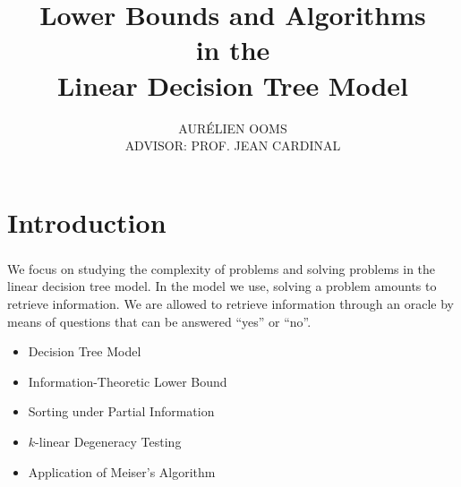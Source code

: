 \documentclass[10pt,xcolor=x11names,dvipsnames,hyperref={colorlinks=false,breaklinks=true,bookmarks=true}]{beamer}
\begin{document}
\title[]{\textbf{Lower Bounds and Algorithms\\ in the\\ Linear Decision Tree Model\vspace{3mm}}}
\author[]{\large AURÉLIEN OOMS\\ADVISOR: PROF. JEAN CARDINAL\vspace{5mm}}
\date{}

\begin{frame}
\titlepage{}
\end{frame}

\section{Introduction}
\begin{frame}\frametitle{\insertsection}\justifying
We focus on studying the complexity of problems and solving problems
in the linear decision tree model. In the model we use, solving a problem
amounts to retrieve information. We are allowed to retrieve information
through an oracle by means of questions that
can be answered ``yes'' or ``no''.\\[7mm]\pause
{}
\begin{itemize}[label={\color{prussianblue}$\bullet$},itemsep=6pt]
\item Decision Tree Model\pause
\item Information-Theoretic Lower Bound\pause
\item Sorting under Partial Information\pause
\item \(k\)-linear Degeneracy Testing\pause
\item Application of Meiser's Algorithm
\end{itemize}
\end{frame}
\end{document}
